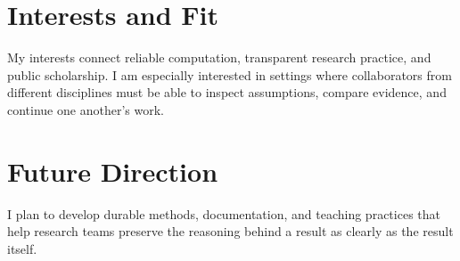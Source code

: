 \documentclass[medium=print]{careerdossier-statement}
\begin{document}
\MakeCDossierStatementHeader

\section*{Interests and Fit}

My interests connect reliable computation, transparent research practice, and
public scholarship. I am especially interested in settings where collaborators
from different disciplines must be able to inspect assumptions, compare
evidence, and continue one another's work.

\newpage

\section*{Future Direction}

I plan to develop durable methods, documentation, and teaching practices that
help research teams preserve the reasoning behind a result as clearly as the
result itself.
\end{document}
